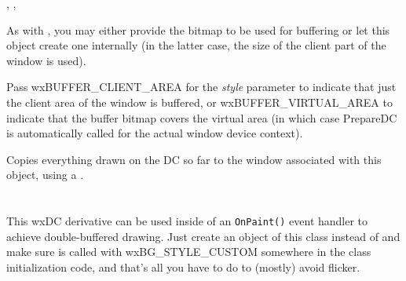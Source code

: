 


,\rtfsp
{},\rtfsp
{}



\label{wxbufferedpaintdcctor}



As with , you may either provide the
bitmap to be used for buffering or let this object create one internally (in
the latter case, the size of the client part of the window is used).

Pass wxBUFFER\_CLIENT\_AREA for the {\it style} parameter to indicate that just the client area of
the window is buffered, or wxBUFFER\_VIRTUAL\_AREA to indicate that the buffer bitmap
covers the virtual area (in which case PrepareDC is automatically called for the actual window
device context).

\label{wxbufferedpaintdcdtor}

Copies everything drawn on the DC so far to the window associated with this
object, using a .



\section{}\label{wxautobufferedpaintdc}

This wxDC derivative can be used inside of an \texttt{OnPaint()} event handler to achieve
double-buffered drawing. Just create an object of this class instead of 
and make sure  is called
with wxBG\_STYLE\_CUSTOM somewhere in the class initialization code, and that's all you have
to do to (mostly) avoid flicker.

